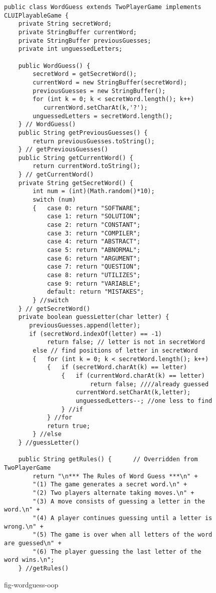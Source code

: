 \begin{figure}[h!!]
\jjjprogstart
\begin{jjjlisting}
\begin{lstlisting}[basicstyle=\scriptsize]
public class WordGuess extends TwoPlayerGame implements CLUIPlayableGame {
    private String secretWord;
    private StringBuffer currentWord;
    private StringBuffer previousGuesses;
    private int unguessedLetters;

    public WordGuess() {   
        secretWord = getSecretWord();
        currentWord = new StringBuffer(secretWord);
        previousGuesses = new StringBuffer();
        for (int k = 0; k < secretWord.length(); k++)
           currentWord.setCharAt(k,'?');
        unguessedLetters = secretWord.length();
    } // WordGuess()
    public String getPreviousGuesses() {
        return previousGuesses.toString();
    } // getPreviousGuesses()
    public String getCurrentWord() {
        return currentWord.toString();
    } // getCurrentWord()
    private String getSecretWord() {   
        int num = (int)(Math.random()*10);
        switch (num)
        {   case 0: return "SOFTWARE";
            case 1: return "SOLUTION";
            case 2: return "CONSTANT";
            case 3: return "COMPILER";
            case 4: return "ABSTRACT";
            case 5: return "ABNORMAL";
            case 6: return "ARGUMENT";
            case 7: return "QUESTION";
            case 8: return "UTILIZES";
            case 9: return "VARIABLE";
            default: return "MISTAKES";
        } //switch
    } // getSecretWord()
    private boolean guessLetter(char letter) {   
       previousGuesses.append(letter);
       if (secretWord.indexOf(letter) == -1)
            return false; // letter is not in secretWord
        else // find positions of letter in secretWord
        {   for (int k = 0; k < secretWord.length(); k++)
            {   if (secretWord.charAt(k) == letter)
                {   if (currentWord.charAt(k) == letter)
                        return false; ////already guessed
                    currentWord.setCharAt(k,letter);
                    unguessedLetters--; //one less to find
                } //if
            } //for
            return true;
        } //else
    } //guessLetter()

    public String getRules() {      // Overridden from TwoPlayerGame
        return "\n*** The Rules of Word Guess ***\n" +
        "(1) The game generates a secret word.\n" +
        "(2) Two players alternate taking moves.\n" +
        "(3) A move consists of guessing a letter in the word.\n" +
        "(4) A player continues guessing until a letter is wrong.\n" +
        "(5) The game is over when all letters of the word are guessed\n" +
        "(6) The player guessing the last letter of the word wins.\n";
    } //getRules()
\end{lstlisting}
\end{jjjlisting}
{fig-wordguess-oop}
\end{figure}



